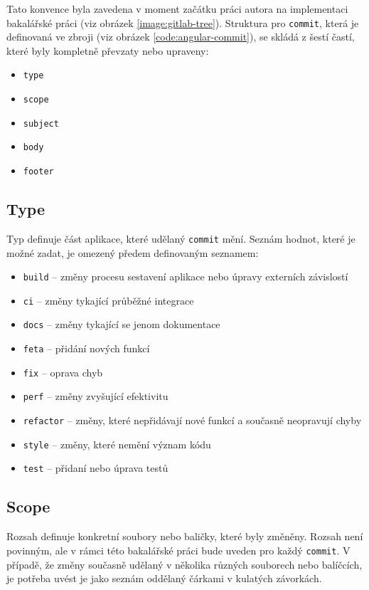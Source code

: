     Tato konvence byla zavedena v moment začátku práci autora na implementaci bakalářské práci (viz obrázek \ref{image:gitlab-tree}). Struktura pro \verb|commit|, která je definovaná ve zbroji (viz obrázek \ref{code:angular-commit}), se skládá z šestí častí, které byly kompletně převzaty nebo upraveny:
    \begin{itemize}
        \item \texttt{type}
        \item \texttt{scope}
        \item \texttt{subject}
        \item \texttt{body}
        \item \texttt{footer}
    \end{itemize}
    
    \subsection{Type}
        Typ definuje část aplikace, které udělaný \verb|commit| mění. Seznám hodnot, které je možné zadat, je omezený předem definovaným seznamem:
        \begin{itemize}
            \item \texttt{build} -- změny procesu sestavení aplikace nebo úpravy externích závislostí
            \item \texttt{ci} -- změny tykající průběžné integrace
            \item \texttt{docs} -- změny tykající se jenom dokumentace
            \item \texttt{feta} -- přidání nových funkcí
            \item \texttt{fix} -- oprava chyb
            \item \texttt{perf} -- změny zvyšující efektivitu
            \item \texttt{refactor} -- změny, které nepřidávají nové funkcí a současně neopravují chyby
            \item \texttt{style} -- změny, které nemění význam kódu
            \item \texttt{test} -- přidaní nebo úprava testů
        \end{itemize}
    
    \subsection{Scope}
        Rozsah definuje konkretní soubory nebo baličky, které byly změněny. Rozsah není povinným, ale v rámci této bakalářské práci bude uveden pro každý \verb|commit|. V případě, že změny současně udělaný v několika různých souborech nebo balíčcích, je potřeba uvést je jako seznám oddělaný čárkami v kulatých závorkách.
    
